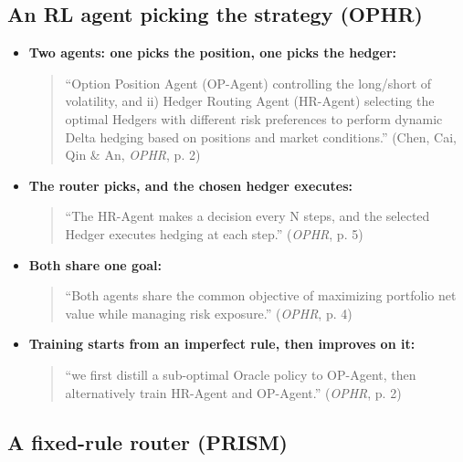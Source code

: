 \documentclass{article}
\begin{document}
\subsection{An RL agent picking the strategy (OPHR)}

\begin{itemize}

\item \textbf{Two agents: one picks the position, one picks the hedger:}

\begin{quote}``Option Position Agent (OP-Agent) controlling the long/\allowbreak{}short of volatility, and ii) Hedger Routing Agent (HR-Agent) selecting the optimal Hedgers with different risk preferences to perform dynamic Delta hedging based on positions and market conditions.'' (Chen, Cai, Qin \& An, \emph{OPHR}, p. 2)\end{quote}

\item \textbf{The router picks, and the chosen hedger executes:}

\begin{quote}``The HR-Agent makes a decision every N steps, and the selected Hedger executes hedging at each step.'' (\emph{OPHR}, p. 5)\end{quote}

\item \textbf{Both share one goal:}

\begin{quote}``Both agents share the common objective of maximizing portfolio net value while managing risk exposure.'' (\emph{OPHR}, p. 4)\end{quote}

\item \textbf{Training starts from an imperfect rule, then improves on it:}

\begin{quote}``we first distill a sub-optimal Oracle policy to OP-Agent, then alternatively train HR-Agent and OP-Agent.'' (\emph{OPHR}, p. 2)\end{quote}

\end{itemize}

\subsection{A fixed-rule router (PRISM)}
\end{document}
